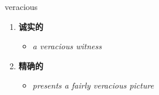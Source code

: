 
\begin{frame}
{\huge veracious}
\begin{center}
\begin{enumerate}\Large
  \item \textbf{诚实的}
  \begin{itemize}
    \item \em{\Large{a veracious witness}}
  \end{itemize}
  \item \textbf{精确的}
  \begin{itemize}
    \item \em{\Large{presents a fairly veracious picture}}
  \end{itemize}
\end{enumerate}
\end{center}
\end{frame}
